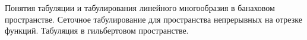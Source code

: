 \documentclass[__main__.tex]{subfiles}
\begin{document}
Понятия табуляции и табулирования линейного многообразия в банаховом пространстве. Сеточное табулирование для пространства непрерывных на отрезке функций. Табуляция в гильбертовом пространстве.
\end{document}
